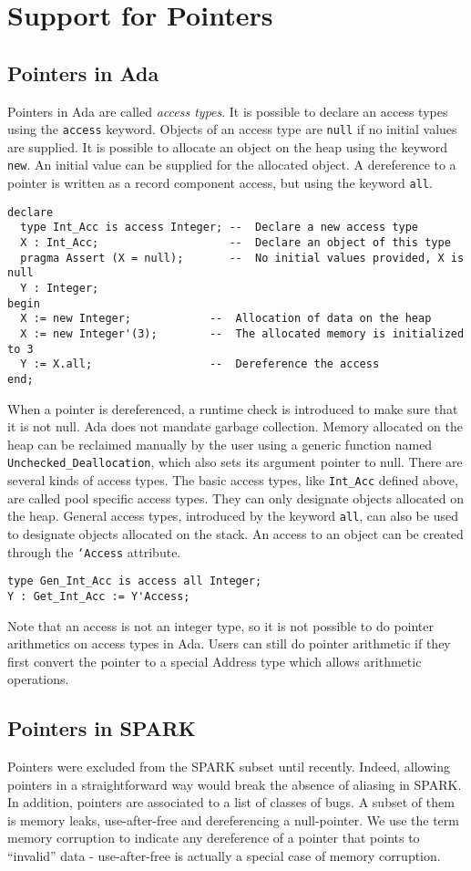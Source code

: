 \documentclass[runningheads]{llncs}
\begin{document}
\section{Support for Pointers\label{sec-pointers}}
\subsection{Pointers in Ada}
Pointers in Ada are called \emph{access types}. It is possible to declare an access types using the \texttt{access} keyword.
Objects of an access type are \texttt{null} if no initial values are supplied.
It is possible to allocate an object on the heap using the keyword \texttt{new}. An initial value can be supplied for the allocated object.
A dereference to a pointer is written as a record component access, but using the keyword \texttt{all}.
\begin{lstlisting}
declare
  type Int_Acc is access Integer; --  Declare a new access type
  X : Int_Acc;                    --  Declare an object of this type
  pragma Assert (X = null);       --  No initial values provided, X is null
  Y : Integer;
begin
  X := new Integer;            --  Allocation of data on the heap
  X := new Integer'(3);        --  The allocated memory is initialized to 3
  Y := X.all;                  --  Dereference the access
end;
\end{lstlisting}
When a pointer is dereferenced, a runtime check is introduced to make sure that it is not null.
Ada does not mandate garbage collection. Memory allocated on the heap can be reclaimed manually by the user using a generic function named \texttt{Unchecked\_Deallocation}, which also sets its argument pointer to null.
There are several kinds of access types. The basic access types, like \texttt{Int\_Acc} defined above, are called pool specific access types. They can only designate objects allocated on the heap. General access types, introduced by the keyword \texttt{all}, can also be used to designate objects allocated on the stack.
An access to an object can be created through the \texttt{`Access} attribute.
\begin{lstlisting}
type Gen_Int_Acc is access all Integer;
Y : Get_Int_Acc := Y'Access;
\end{lstlisting}
Note that an access is not an integer type, so it is not possible to do pointer arithmetics on access types in Ada. Users can still do pointer arithmetic if they first convert the pointer to a special Address type which allows arithmetic operations.

\subsection{Pointers in SPARK}
Pointers were excluded from the SPARK subset until recently. Indeed, allowing pointers in a straightforward way would break the absence of aliasing in SPARK. In addition, pointers are associated to a list of classes of bugs. A subset of them is memory leaks, use-after-free and dereferencing a null-pointer. We use the term memory corruption to indicate any dereference of a pointer that points to “invalid” data - use-after-free is actually a special case of memory corruption.
\end{document}
